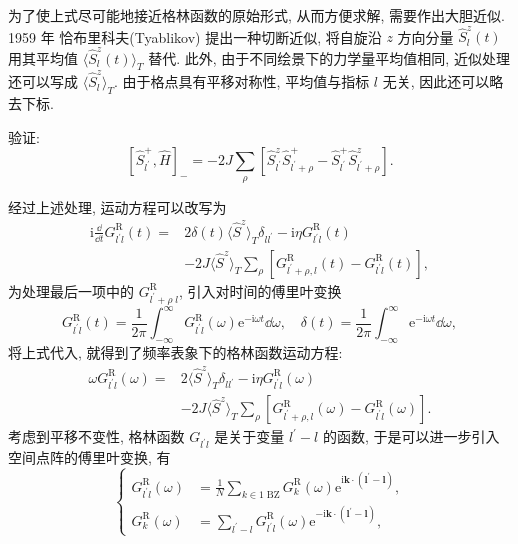 为了使上式尽可能地接近格林函数的原始形式, 从而方便求解, 需要作出大胆近似. 1959 年 恰布里科夫(Tyablikov) 提出一种切断近似, 将自旋沿 $z$ 方向分量 $\hat{S}_l^z(t)$ 用其平均值 $\langle \hat{S}_l^z(t) \rangle_T$ 替代. 此外, 由于不同绘景下的力学量平均值相同, 近似处理还可以写成 $\langle \hat{S}_l^z \rangle_T$. 由于格点具有平移对称性, 平均值与指标 $l$ 无关, 因此还可以略去下标. 
\begin{question}{}{}
    验证:
    \begin{equation}
        \left[ \hat{S}_{l^\prime}^+,\hat{H} \right]_-=-2J\sum_\rho\left[ \hat{S}_{l^\prime}^z\hat{S}_{l^\prime+\rho}^+-\hat{S}_{l^\prime}^+\hat{S}_{l^\prime+\rho}^z \right].
    \end{equation}
\end{question}

经过上述处理, 运动方程可以改写为
   \begin{align}
        \mathrm{i}\frac{\dd}{\dd t}G_{l^\prime l}^{\mathrm{R}}(t)=&2\delta(t)\langle \hat{S}^z \rangle_T\delta_{ll^\prime}-\mathrm{i}\eta G_{l^{\prime} l}^{\mathrm{R}}(t)\nonumber\\
        &-2J\langle \hat{S}^z \rangle_T\sum_\rho \left[ G_{l^\prime+\rho,l}^{\mathrm{R}}(t)-G_{l^\prime l }^{\mathrm{R}}(t) \right],
    \end{align}
为处理最后一项中的 $G_{l^\prime+\rho\; l}^{\mathrm{R}}$, 引入对时间的傅里叶变换
\begin{equation}
    G_{l^\prime l}^{\mathrm{R}}(t)=\frac{1}{2\pi}\int_{-\infty}^{\infty}G_{ l^\prime l}^{\mathrm{R}}(\omega)\mathrm{e}^{-\mathrm{i}\omega t}\dd \omega,\quad \delta(t)=\frac{1}{2\pi}\int_{-\infty}^\infty \mathrm{e}^{-\mathrm{i}\omega t}\dd \omega,
\end{equation}
将上式代入, 就得到了频率表象下的格林函数运动方程:
\begin{align}
        \omega G_{l^\prime l}^{\mathrm{R}}(\omega)=&2\langle \hat{S}^z \rangle_T\delta_{ ll^\prime}-\mathrm{i}\eta G_{l^\prime l}^{\mathrm{R}}(\omega)\nonumber\\
        &-2J\langle \hat{S}^z \rangle_T\sum_{\rho}\left[ G_{l^\prime+\rho,l}^\mathrm{R}(\omega)-G_{l^\prime l }^{\mathrm{R}}(\omega) \right].
    \end{align}
考虑到平移不变性, 格林函数 $G_{l^\prime l}$ 是关于变量 $l^\prime-l$ 的函数, 于是可以进一步引入空间点阵的傅里叶变换, 有
\begin{equation}
    \left\{
        \begin{aligned}
            G_{l^\prime l}^{\mathrm{R}}(\omega)&=\frac{1}{N}\sum_{k\in 1\;\mathrm{BZ}} G_k^{\mathrm{R}}(\omega)\mathrm{e}^{\mathrm{i}\boldsymbol{k}\cdot (\boldsymbol{l}^\prime-\boldsymbol{l})},\\
            G_k^{\mathrm{R}}(\omega)&=\sum_{l^\prime -l}G_{l^\prime l }^{\mathrm{R}}(\omega)\mathrm{e}^{-\mathrm{i}\boldsymbol{k}\cdot(\boldsymbol{l}^\prime-\boldsymbol{l})},
        \end{aligned}
    \right.
\end{equation}
